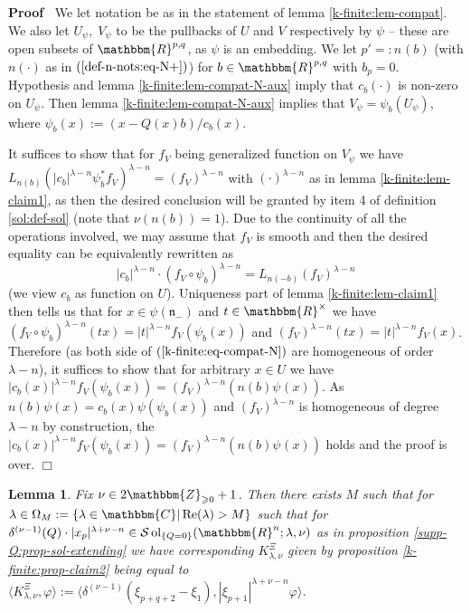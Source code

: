 \documentclass{article}
\newcommand{\assign}{:=}
\newcommand{\nocomma}{}
\newcommand{\tmop}[1]{\ensuremath{\operatorname{#1}}}
\newenvironment{proof}{\noindent\textbf{Proof\ }}{\hspace*{\fill}$\Box$\medskip}
\newtheorem{lemma}{Lemma}
\begin{document}
\begin{proof}
  We let notation be as in the statement of lemma \ref{k-finite:lem-compat}.
  We also let $U_{\psi}, \; V_{\psi}$ to be the pullbacks of $U$ and $V$
  respectively by $\psi$ -- these are open subsets of $\mathbbm{R}^{p, q}$, as
  $\psi$ is an embedding. We let $p' = : n_{} (b)$ (with $n (\cdot)$ as in
  $(\ref{def-n-nots:eq-N+})$) for $b \in \mathbbm{R}^{p, q}$ with $b_p = 0$.
  Hypothesis and lemma \ref{k-finite:lem-compat-N-aux} imply that $c_b
  (\cdot)$ is non-zero on $U_{\psi}$. Then lemma
  \ref{k-finite:lem-compat-N-aux} implies that $V_{\psi} = \psi_b (U_{\psi})$,
  where $\psi_b (x) \assign (x - Q (x) b) / c_b (x)$.
  
  It suffices to show that for $f_V$ being generalized function on $V_{\psi}$
  we have $L_{n (b)} (| c_b |^{\lambda - n} \psi_b^{\ast} f_V)^{\lambda - n} =
  (f_V)^{\lambda - n}$ with $(\cdot)^{\lambda - n}$ as in lemma
  \ref{k-finite:lem-claim1}, as then the desired conclusion will be granted by
  item 4 of definition \ref{sol:def-sol} (note that $\nu (n (b)) = 1$). Due to
  the continuity of all the operations involved, we may assume that $f_V$ is
  smooth and then the desired equality can be equivalently rewritten as
  \begin{equation}
    | c_b |^{\lambda - n} \cdot (f_V \circ \psi_b^{})^{\lambda - n} = L_{n (-
    b)} (f_V)^{\lambda - n} \label{k-finite:eq-compat-N}
  \end{equation}
  (we view $c_b$ as function on $U$). Uniqueness part of lemma
  \ref{k-finite:lem-claim1} then tells us that for $x \in \psi
  (\mathfrak{n}_-)$ and $t \in \mathbbm{R}^{\times}$ we have $(f_V \circ
  \psi_b^{})^{\lambda - n} (t x) = | t |^{\lambda - n} f_V (\psi_b (x))$ and
  $(f_V)^{\lambda - n} (t x) = | t |^{\lambda - n} f_V (x)$. Therefore (as
  both side of $(\ref{k-finite:eq-compat-N})$ are homogeneous of order
  $\lambda - n$), it suffices to show that for arbitrary $x \in U$ we have $|
  c_b (x) |^{\lambda - n} f_V (\psi_b (x)) = (f_V)^{\lambda - n} (n (b)
  \psi_{} (x))$. As $n (b) \psi (x) = c_b (x) \psi (\psi_b (x))$ and
  $(f_V)^{\lambda - n}$ is homogeneous of degree $\lambda - n$ by
  construction, the $| c_b (x) |^{\lambda - n} f_V (\psi_b (x)) =
  (f_V)^{\lambda - n} (n (b) \psi_{} (x))$ holds and the proof is over.
\end{proof}

\begin{lemma}
  \label{k-finite:lem-c1}Fix $\nu \in 2\mathbbm{Z}_{\geqslant 0} + 1$. Then
  there exists $M$ such that for $\lambda \in \Omega_M \assign \{ \lambda \in
  \mathbbm{C} | \tmop{Re} (\lambda) > M \}$ such that for $\delta^{(\nu - 1)}
  (Q) \cdot | x_p |^{\lambda + \nu - n} \in \mathcal{S} \tmop{ol}_{\{ Q = 0
  \}} (\mathbbm{R}^n ; \lambda, \nu)$ as in proposition
  \ref{supp-Q:prop-sol-extending} we have corresponding $K^{\Xi}_{\lambda,
  \nu}$ given by proposition \ref{k-finite:prop-claim2} being equal to
  $\langle K_{\lambda, \nu}^{\Xi}, \varphi \rangle \assign \langle
  \delta^{(\nu - 1)} (\xi_{p + q + 2} - \xi_1) \nocomma, | \xi_{p + 1}
  |^{\lambda + \nu - n} \varphi \nocomma \rangle$.
\end{lemma}
\end{document}
